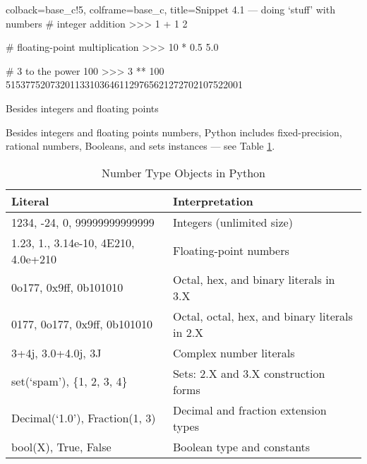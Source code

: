\documentclass[a4paper,11pt]{book}
\numberwithin{figure}{chapter}
\numberwithin{table}{chapter}
\newcommand{\question}[1]{%
    \begin{tcolorbox}[colback=comp_c!10,colframe=comp_c,sidebyside align=top,width=\linewidth,before skip=1ex]
        #1
    \end{tcolorbox}
    \switchcolumn%
}
\newcommand{\note}[1]{%
    \begin{tcolorbox}[colback=white!0,colframe=white!10,width=\linewidth,before skip=1ex]
        #1
    \end{tcolorbox}
}
\begin{document}
\begin{pythoncode}[linenos=true,]{colback=base_c!5, colframe=base_c, title=\sffamily Snippet 4.1 --- doing `stuff' with numbers}
# integer addition
>>> 1 + 1
2

# floating-point multiplication
>>> 10 * 0.5
5.0

# 3 to the power 100
>>> 3 ** 100
515377520732011331036461129765621272702107522001

\end{pythoncode}

\begin{paracol}{2}
	\question{\raggedright Besides integers and floating points}
    \note{Besides integers and floating points numbers, Python includes fixed-precision, rational numbers, Booleans, and sets instances --- see Table \ref{tab:number_types_in_python}.}
\end{paracol}

\begin{table}[!htbp]
	\centering
	\caption{Number Type Objects in Python}
	\label{tab:number_types_in_python}
	\begin{tabular}{ll}
		\toprule \toprule
		Literal & Interpretation\\
		\midrule
		 1234, -24, 0, 99999999999999 & Integers (unlimited size)\\
		 1.23, 1., 3.14e-10, 4E210, 4.0e+210 & Floating-point numbers \\
		 0o177, 0x9ff, 0b101010 & Octal, hex, and binary literals in 3.X \\
		 0177, 0o177, 0x9ff, 0b101010 & Octal, octal, hex, and binary literals in 2.X \\
		 3+4j, 3.0+4.0j, 3J & Complex number literals \\
		 set(`spam'), \{1, 2, 3, 4\} & Sets: 2.X and 3.X construction forms\\ Decimal(`1.0'), Fraction(1, 3) & Decimal and fraction extension types\\
		 bool(X), True, False & Boolean type and constants\\
		 \bottomrule
	\end{tabular}
\end{table}
\end{document}
